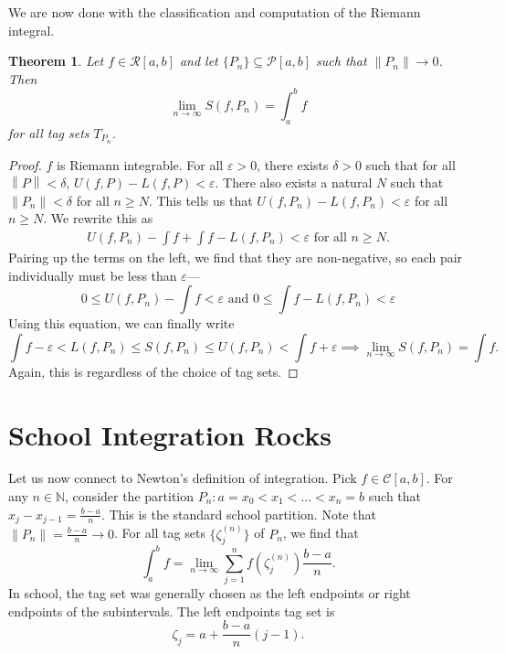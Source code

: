 \documentclass[15pt,a4paper]{book}
\newtheorem{theorem}{Theorem}[chapter]
\theoremstyle{definition}
\newcommand{\N}{\mathbb{N}} %
\newcommand{\cP}{\mathcal{P}}
\newcommand{\cR}{\mathcal{R}}
\newcommand{\cC}{\mathcal{C}}
\newcommand{\norm}[1]{\left\lVert#1\right\rVert}
\begin{document}
We are now done with the classification and computation of the Riemann integral.

\begin{theorem}
    Let $f \in \cR[a,b]$ and let $\{P_{n}\} \subseteq \cP[a,b]$ such that $\norm{P_{n}} \to 0$. Then
    \begin{equation}
        \lim_{n \to \infty} S(f,P_{n}) = \int_{a}^{b} f
    \end{equation}
    for all tag sets $T_{P_{n}}$.
\end{theorem}
\begin{proof}
    $f$ is Riemann integrable. For all $\varepsilon > 0$, there exists $\delta > 0$ such that for all $\norm{P} < \delta$, $U(f,P)-L(f,P) < \varepsilon$. There also exists a natural $N$ such that $\norm{P_{n}} < \delta$ for all $n \geq N$. This tells us that $U(f,P_{n})-L(f,P_{n}) < \varepsilon$ for all $n \geq N$. We rewrite this as
    \begin{align}
        U(f,P_{n}) - \int f + \int f - L(f,P_{n}) < \varepsilon \text{ for all } n \geq N.
    \end{align}
    Pairing up the terms on the left, we find that they are non-negative, so each pair individually must be less than $\varepsilon$---
    \begin{equation}
        0 \leq U(f,P_{n}) - \int f < \varepsilon \text{ and } 0 \leq \int f - L(f,P_{n}) < \varepsilon
    \end{equation}
    Using this equation, we can finally write
    \begin{equation}
        \int f - \varepsilon < L(f,P_{n}) \leq S(f,P_{n}) \leq U(f,P_{n}) < \int f + \varepsilon \implies \lim_{n \to \infty} S(f,P_{n}) = \int f.        
    \end{equation}
    Again, this is regardless of the choice of tag sets.
\end{proof}
\section{School Integration Rocks}
Let us now connect to Newton's definition of integration. Pick $f \in \cC[a,b]$. For any $n \in \N$, consider the partition $P_{n} : a = x_{0} < x_{1} < \ldots < x_{n} = b$ such that $x_{j}-x_{j-1} = \frac{b-a}{n}$. This is the standard school partition. Note that $\norm{P_{n}} = \frac{b-a}{n} \to 0$. For all tag sets $\{\zeta_{j}^{(n)}\}$ of $P_{n}$, we find that
\begin{equation}
    \int_{a}^{b} f = \lim_{n \to \infty} \sum_{j=1}^{n} f(\zeta_{j}^{(n)}) \frac{b-a}{n}.
\end{equation}
In school, the tag set was generally chosen as the left endpoints or right endpoints of the subintervals. The left endpoints tag set is
\begin{equation}
    \zeta_{j} = a + \frac{b-a}{n}(j-1).
\end{equation}
\end{document}
